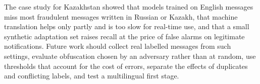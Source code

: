 The case study for Kazakhstan showed that models trained on English messages miss most fraudulent messages written in Russian or Kazakh, that machine translation helps only partly and is too slow for real-time use, and that a small synthetic adaptation set raises recall at the price of false alarms on legitimate notifications. Future work should collect real labelled messages from such settings, evaluate obfuscation chosen by an adversary rather than at random, use thresholds that account for the cost of errors, separate the effects of duplicates and conflicting labels, and test a multilingual first stage.
